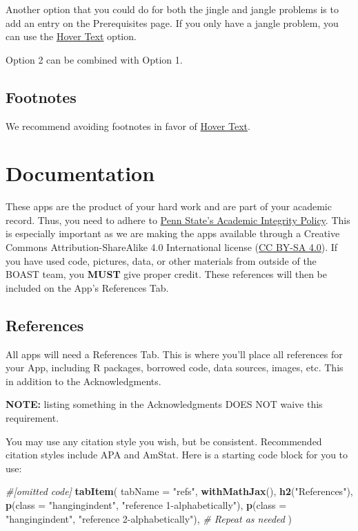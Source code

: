 \documentclass[
]{book}
\newenvironment{Shaded}{\begin{snugshade}}{\end{snugshade}}
\newcommand{\CommentTok}[1]{\textcolor[rgb]{0.56,0.35,0.01}{\textit{#1}}}
\newcommand{\DataTypeTok}[1]{\textcolor[rgb]{0.13,0.29,0.53}{#1}}
\newcommand{\KeywordTok}[1]{\textcolor[rgb]{0.13,0.29,0.53}{\textbf{#1}}}
\newcommand{\NormalTok}[1]{#1}
\newcommand{\StringTok}[1]{\textcolor[rgb]{0.31,0.60,0.02}{#1}}
\begin{document}
Another option that you could do for both the jingle and jangle problems is to add an entry on the Prerequisites page. If you only have a jangle problem, you can use the \protect\hyperlink{hovertext}{Hover Text} option.

Option 2 can be combined with Option 1.

\hypertarget{footnotes}{%
\section{Footnotes}\label{footnotes}}

We recommend avoiding footnotes in favor of \protect\hyperlink{hovertext}{Hover Text}.

\hypertarget{documentation}{%
\chapter{Documentation}\label{documentation}}

These apps are the product of your hard work and are part of your academic record. Thus, you need to adhere to \href{https://undergrad.psu.edu/aappm/G-9-academic-integrity.html}{Penn State's Academic Integrity Policy}. This is especially important as we are making the apps available through a Creative Commons Attribution-ShareAlike 4.0 International license (\href{https://creativecommons.org/licenses/by-sa/4.0/}{CC BY-SA 4.0}). If you have used code, pictures, data, or other materials from outside of the BOAST team, you \textbf{MUST} give proper credit. These references will then be included on the App's References Tab.

\hypertarget{references-1}{%
\section{References}\label{references-1}}

All apps will need a References Tab. This is where you'll place all references for your App, including R packages, borrowed code, data sources, images, etc. This in addition to the Acknowledgments.

\textbf{NOTE:} listing something in the Acknowledgments DOES NOT waive this requirement.

You may use any citation style you wish, but be consistent. Recommended citation styles include APA and AmStat. Here is a starting code block for you to use:

\begin{Shaded}
\begin{Highlighting}[]
\CommentTok{#[omitted code]}
\KeywordTok{tabItem}\NormalTok{(}
  \DataTypeTok{tabName =} \StringTok{"refs"}\NormalTok{,}
  \KeywordTok{withMathJax}\NormalTok{(),}
  \KeywordTok{h2}\NormalTok{(}\StringTok{"References"}\NormalTok{),}
  \KeywordTok{p}\NormalTok{(}\DataTypeTok{class =} \StringTok{"hangingindent"}\NormalTok{,}
    \StringTok{"reference 1-alphabetically"}\NormalTok{),}
  \KeywordTok{p}\NormalTok{(}\DataTypeTok{class =} \StringTok{"hangingindent"}\NormalTok{,}
    \StringTok{"reference 2-alphabetically"}\NormalTok{),}
  \CommentTok{# Repeat as needed}
\NormalTok{)}
\end{Highlighting}
\end{Shaded}
\end{document}
